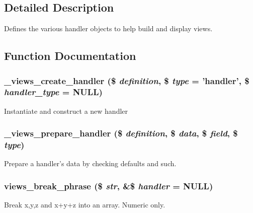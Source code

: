 \subsection{Detailed Description}
Defines the various handler objects to help build and display views. 

\subsection{Function Documentation}
\hypertarget{handlers_8inc_adb01fd80de3fb9f4583b2ae5e6dcd5be}{
\subsubsection[{\_\-views\_\-create\_\-handler}]{\setlength{\rightskip}{0pt plus 5cm}\_\-views\_\-create\_\-handler (\$ {\em definition}, \/  \$ {\em type} = {\ttfamily 'handler'}, \/  \$ {\em handler\_\-type} = {\ttfamily NULL})}}
\label{handlers_8inc_adb01fd80de3fb9f4583b2ae5e6dcd5be}
Instantiate and construct a new handler \hypertarget{handlers_8inc_ad181d2d2434c64eee6344b0eeb1fa074}{
\subsubsection[{\_\-views\_\-prepare\_\-handler}]{\setlength{\rightskip}{0pt plus 5cm}\_\-views\_\-prepare\_\-handler (\$ {\em definition}, \/  \$ {\em data}, \/  \$ {\em field}, \/  \$ {\em type})}}
\label{handlers_8inc_ad181d2d2434c64eee6344b0eeb1fa074}
Prepare a handler's data by checking defaults and such. \hypertarget{handlers_8inc_abe4b24879b13b3e43ad741951af113e0}{
\subsubsection[{views\_\-break\_\-phrase}]{\setlength{\rightskip}{0pt plus 5cm}views\_\-break\_\-phrase (\$ {\em str}, \/  \&\$ {\em handler} = {\ttfamily NULL})}}
\label{handlers_8inc_abe4b24879b13b3e43ad741951af113e0}
Break x,y,z and x+y+z into an array. Numeric only.


